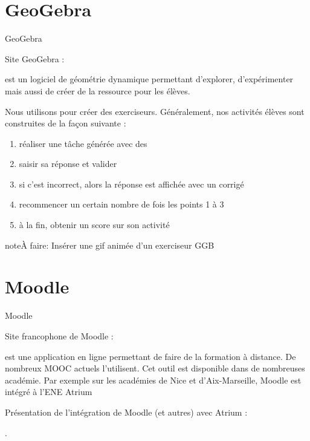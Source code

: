 \documentclass[letterpaper,10pt,french]{sphinxmanual}
\begin{document}
\section{GeoGebra}
\label{\detokenize{projet-description:geogebra}}
GeoGebra %
\begin{footnote}[2]\sphinxAtStartFootnote
Site GeoGebra : 
%
\end{footnote} est un logiciel de géométrie dynamique permettant d’explorer,
d’expérimenter mais aussi de créer de la ressource pour les élèves.

Nous utilisons  pour créer des exerciseurs. Généralement, nos activités
élèves sont construites de la façon suivante :
\begin{enumerate}
\item {} 
réaliser une tâche générée avec des 

\item {} 
saisir sa réponse et valider

\item {} 
si c’est incorrect, alors la réponse est affichée avec un corrigé

\item {} 
recommencer un certain nombre de fois les points 1 à 3

\item {} 
à la fin, obtenir un score sur son activité

\end{enumerate}

\begin{sphinxadmonition}{note}{\label{projet-description:index-0}À faire:}
Insérer une gif animée d’un exerciseur GGB
\end{sphinxadmonition}


\section{Moodle}
\label{\detokenize{projet-description:moodle}}
Moodle %
\begin{footnote}[3]\sphinxAtStartFootnote
Site francophone de Moodle : 
%
\end{footnote} est une application en ligne permettant de faire de la formation à
distance. De nombreux MOOC actuels l’utilisent. Cet outil est disponible dans de
nombreuses académie. Par exemple sur les académies de Nice et d’Aix-Marseille, Moodle
est intégré à l’ENE Atrium %
\begin{footnote}[4]\sphinxAtStartFootnote
Présentation de l’intégration de Moodle (et autres) avec
Atrium : 
%
\end{footnote}.
\end{document}
